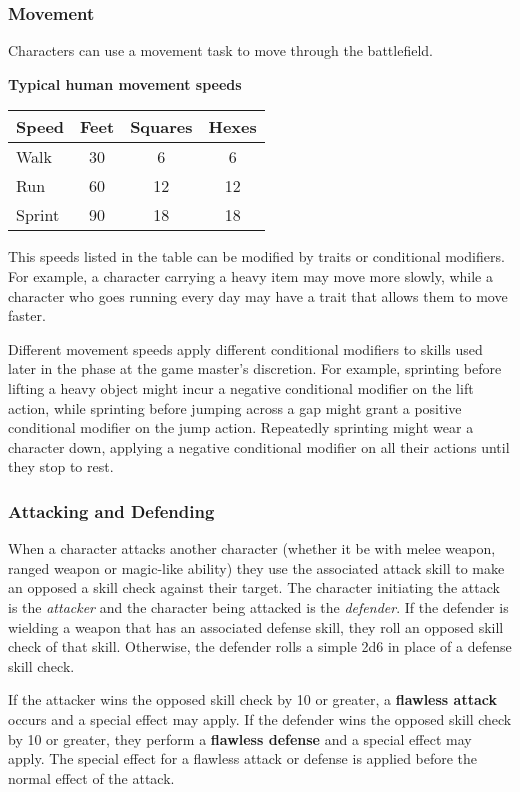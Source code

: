 \documentclass[11pt]{article}
\begin{document}
\subsubsection{Movement}
Characters can use a movement task to move through the battlefield. 

\begin{center}
	\textbf{Typical human movement speeds} \\
	\begin{tabular}{lccc}
		Speed  & Feet & Squares & Hexes \\
		\hline
		Walk   & 30   & 6       & 6     \\
		Run    & 60   & 12      & 12    \\
		Sprint & 90   & 18      & 18    \\
	\end{tabular}
\end{center}

This speeds listed in the table can be modified by traits or conditional modifiers.
For example, a character carrying a heavy item may move more slowly, while a character who goes running every day may have a trait that allows them to move faster.

Different movement speeds apply different conditional modifiers to skills used later in the phase at the game master's discretion.
For example, sprinting before lifting a heavy object might incur a negative conditional modifier on the lift action, while sprinting before jumping across a gap might grant a positive conditional modifier on the jump action.
Repeatedly sprinting might wear a character down, applying a negative conditional modifier on all their actions until they stop to rest.

\subsubsection{Attacking and Defending}
When a character attacks another character (whether it be with melee weapon, ranged weapon or magic-like ability) they use the associated attack skill to make an opposed a skill check against their target.
The character initiating the attack is the \emph{attacker} and the character being attacked is the \emph{defender}.
If the defender is wielding a weapon that has an associated defense skill, they roll an opposed skill check of that skill.
Otherwise, the defender rolls a simple 2d6 in place of a defense skill check.

If the attacker wins the opposed skill check by 10 or greater, a \textbf{flawless attack} occurs and a special effect may apply. If the defender wins the opposed skill check by 10 or greater, they perform a \textbf{flawless defense} and a special effect may apply. The special effect for a flawless attack or defense is applied before the normal effect of the attack.
\end{document}

